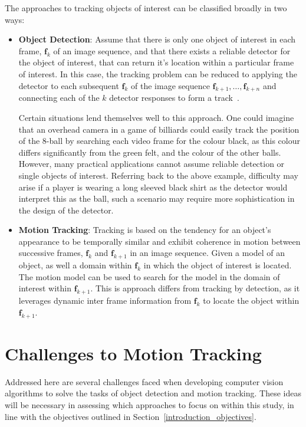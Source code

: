 The approaches to tracking objects of interest can be classified broadly in two ways:
\begin{itemize}
    \item \textbf{Object Detection}: Assume that there is only one object
        of interest in each frame, $\mathbf{f}_k$ of an image sequence, and that
        there exists a reliable detector for the object of interest, that can
        return it's location within a particular frame of interest. In this case, the
        tracking problem can be reduced to applying the detector to each
        subsequent $\mathbf{f}_k$ of the image sequence
        $\mathbf{f}_{k+1},\ldots,\mathbf{f}_{k+n}$ and connecting each of the
        $k$ detector responses to form a track~\cite{Forsyth2012}.

        Certain situations lend themselves well to this approach. One could
        imagine that an overhead camera in a game of billiards could easily track the
        position of the 8-ball by searching each video frame for the colour black, as
        this colour differs significantly from the green felt, and the colour of the
        other balls. However, many practical applications cannot assume reliable
        detection or single objects of interest.  Referring back to the above example,
        difficulty may arise if a player is wearing a long sleeved black shirt as the
        detector would interpret this as the ball, such a scenario may require more
        sophistication in the design of the detector.

    \item \textbf{Motion Tracking}: Tracking is based on the tendency for an object's
        appearance to be temporally similar and exhibit coherence in motion
        between successive frames, $\mathbf{f}_k$ and $\mathbf{f}_{k+1}$ in an
        image sequence. Given a model of an object, as well a domain within
        $\mathbf{f}_k$ in which the object of interest is located. The motion
        model can be used to search for the model in the domain of interest
        within $\mathbf{f}_{k+1}$.  This is approach differs from tracking by
        detection, as it leverages dynamic inter frame information from
        $\mathbf{f}_k$ to locate the object within $\mathbf{f}_{k+1}$.
\end{itemize}

\section{Challenges to Motion Tracking}\label{literature_review_challenges}
Addressed here are several challenges faced when developing computer
vision algorithms to solve the tasks of object detection and motion tracking. 
These ideas will be necessary in assessing which approaches to focus on within
this study, in line with the objectives outlined in Section~\ref{introduction_objectives}.


